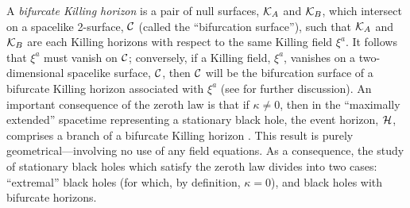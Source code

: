 A {\em bifurcate Killing horizon} is a pair of null surfaces, ${\cal
K}_A$ and ${\cal K}_B$, which intersect on a spacelike 2-surface,
$\cal C$ (called the ``bifurcation surface''), such that ${\cal K}_A$
and ${\cal K}_B$ are each Killing horizons with respect to the same
Killing field $\xi^a$. It follows that $\xi^a$ must vanish on $\cal
C$; conversely, if a Killing field, $\xi^a$, vanishes on a
two-dimensional spacelike surface, ${\cal C}$, then ${\cal C}$ will be
the bifurcation surface of a bifurcate Killing horizon associated with
$\xi^a$ (see \cite{w4} for further discussion). An important
consequence of the zeroth law is that if $\kappa \neq 0$, then in the
``maximally extended'' spacetime representing a stationary black hole,
the event horizon, ${\cal H}$, comprises a branch of a bifurcate
Killing horizon \cite{rw2}. This result is purely
geometrical---involving no use of any field equations. As a
consequence, the study of stationary black holes which satisfy the
zeroth law divides into two cases: ``extremal'' black holes (for
which, by definition, $\kappa = 0$), and black holes with bifurcate
horizons.

